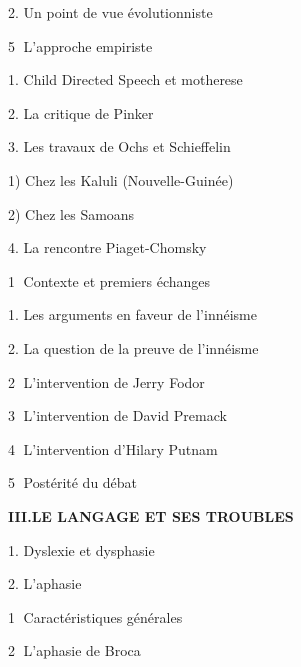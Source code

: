 \begin{keybox}
\hspace*{3em}2. Un point de vue évolutionniste\par
\hspace*{2em}\textcircled{\scriptsize 5} L’approche empiriste\par
\hspace*{3em}1. Child Directed Speech et motherese\par
\hspace*{3em}2. La critique de Pinker\par
\hspace*{3em}3. Les travaux de Ochs et Schieffelin\par
\hspace*{4em}1) Chez les Kaluli (Nouvelle-Guinée)\par
\hspace*{4em}2) Chez les Samoans\par
\hspace*{1em}4. La rencontre Piaget-Chomsky\par
\hspace*{2em}\textcircled{\scriptsize 1} Contexte et premiers échanges\par
\hspace*{3em}1. Les arguments en faveur de l’innéisme\par
\hspace*{3em}2. La question de la preuve de l’innéisme\par
\hspace*{2em}\textcircled{\scriptsize 2} L’intervention de Jerry Fodor\par
\hspace*{2em}\textcircled{\scriptsize 3} L’intervention de David Premack\par
\hspace*{2em}\textcircled{\scriptsize 4} L’intervention d’Hilary Putnam\par
\hspace*{2em}\textcircled{\scriptsize 5} Postérité du débat\par
\textbf{III.\quad LE LANGAGE ET SES TROUBLES}\par
\hspace*{1em}1. Dyslexie et dysphasie\par
\hspace*{1em}2. L’aphasie\par
\hspace*{2em}\textcircled{\scriptsize 1} Caractéristiques générales\par
\hspace*{2em}\textcircled{\scriptsize 2} L’aphasie de Broca\par

\end{keybox}
